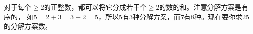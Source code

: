 \vspace{6pt}
\par 对于每个$\ge 2$的正整数，都可以将它分成若干个$\ge 2$的数的和。注意分解方案是有序的，
如$5=2+3=3+2=5$，所以$5$有3种分解方案，而$7$有8种。现在要你求$25$的分解方案数。
